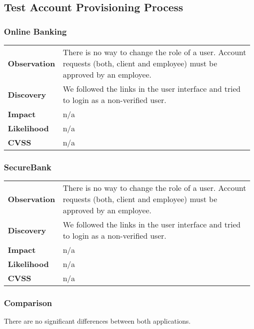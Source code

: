 \clearpage



\subsection{Test Account Provisioning Process}

\subsubsection*{Online Banking}

\begin{tabular}{l|p{10cm}}

\textbf{Observation} & There is no way to change the role of a user. Account requests (both, client and employee) must be approved by an employee.  \\
\textbf{Discovery} & We followed the links in the user interface and tried to login as a non-verified user. \\
\textbf{Impact} & n/a \\
\textbf{Likelihood} & n/a \\
\textbf{CVSS} & n/a \\
\end{tabular}

\subsubsection*{SecureBank}

\begin{tabular}{l|p{10cm}}

\textbf{Observation} & There is no way to change the role of a user. Account requests (both, client and employee) must be approved by an employee.  \\
\textbf{Discovery} & We followed the links in the user interface and tried to login as a non-verified user. \\
\textbf{Impact} & n/a \\
\textbf{Likelihood} & n/a \\
\textbf{CVSS} & n/a \\
\end{tabular}

\subsubsection*{Comparison}
There are no significant differences between both applications.

\clearpage





